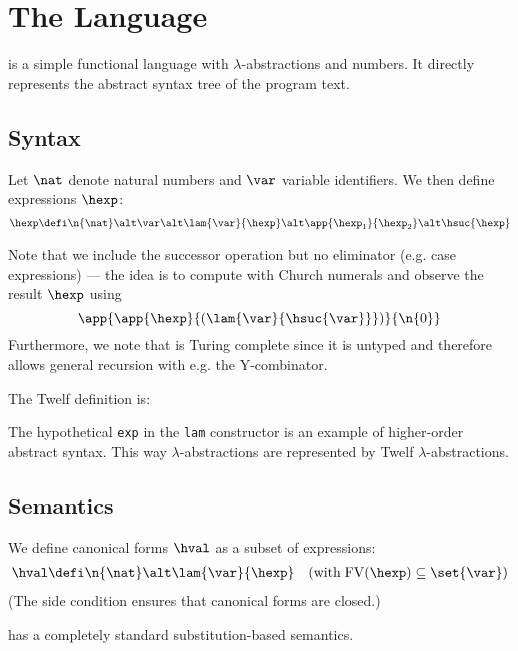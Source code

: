 \clearpage

\section{The \textnormal{\hlang} Language}

\hlang is a simple functional language with $\lambda$-abstractions and numbers.
It directly represents the abstract syntax tree of the program text.


\subsection{Syntax}

Let $\nat$ denote natural numbers and $\var$ variable identifiers. We then define \hlang expressions $\hexp$:
\begin{align*}
  \hexp &\defi \n{\nat} \alt \var \alt \lam{\var}{\hexp} \alt \app{\hexp_1}{\hexp_2} \alt \hsuc{\hexp} \\
\end{align*}

Note that we include the successor operation but no eliminator (e.g. case expressions) --- the idea is to compute with Church numerals and observe the result $\hexp$ using
\[
\app{\app{\hexp}{(\lam{\var}{\hsuc{\var}}})}{\n{0}}
\]
Furthermore, we note that \hlang is Turing complete since it is untyped and therefore allows general recursion with e.g. the Y-combinator.

\Twelf
The Twelf definition is:

The hypothetical \texttt{exp} in the \texttt{lam} constructor is an example of higher-order abstract syntax.
This way \hlang $\lambda$-abstractions are represented by Twelf $\lambda$-abstractions.


\subsection{Semantics}

We define canonical forms $\hval$ as a subset of expressions:
\begin{align*}
  \hval &\defi \n{\nat} \alt \lam{\var}{\hexp} \quad (\text{with} \; \mathrm{FV}(\hexp) \subseteq \set{\var}) \\
\end{align*}
(The side condition ensures that canonical forms are closed.)

\hlang has a completely standard substitution-based semantics.

